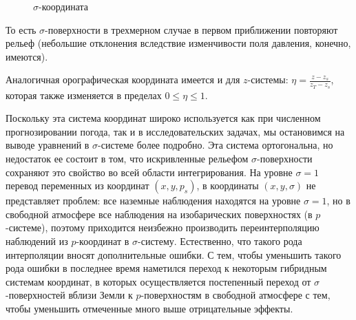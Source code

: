     \begin{figure}[h]
        \centering
        \caption{\label{fig:ch9.1} $\sigma$-координата}
    \end{figure}    

То есть $\sigma$-поверхности в трехмерном случае в первом приближении повторяют рельеф (небольшие отклонения вследствие изменчивости поля давления, конечно, имеются).

Аналогичная орографическая координата имеется и для $z$-системы: $\eta=\frac{z-z_s}{z_T-z_s}$, которая также изменяется в пределах $0\leq\eta\leq1$.

Поскольку эта система координат широко используется как при численном прогнозировании погода, так и в исследовательских задачах, мы остановимся на выводе уравнений в $\sigma$-системе более подробно. Эта система ортогональна, но недостаток ее состоит в том, что искривленные рельефом $\sigma$-поверхности сохраняют это свойство во всей области интегрирования. На уровне $\sigma=1$ перевод переменных из координат $(x,y,p_s)$, в координаты $(x,y,\sigma)$ не представляет проблем: все наземные наблюдения находятся на уровне $\sigma=1$, но в свободной атмосфере все наблюдения на изобарических поверхностях (в $p$-системе), поэтому приходится неизбежно производить переинтерполяцию наблюдений из $p$-координат в $\sigma$-систему. Естественно, что такого рода интерполяции вносят дополнительные ошибки. С тем, чтобы уменьшить такого рода ошибки в последнее время наметился переход к некоторым гибридным системам координат, в которых осуществляется постепенный переход от $\sigma$-поверхностей вблизи Земли к $p$-поверхностям в свободной атмосфере с тем, чтобы уменьшить отмеченные много выше отрицательные эффекты. 

